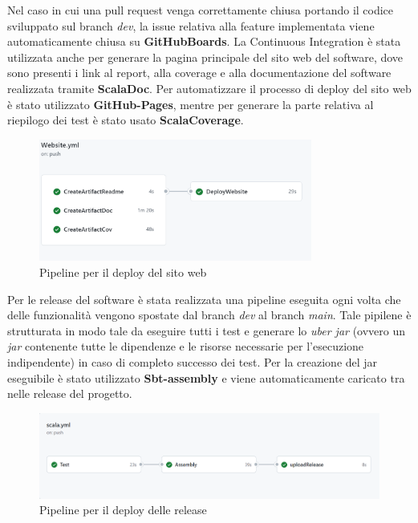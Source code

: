         Nel caso in cui una pull request venga correttamente chiusa portando il codice sviluppato sul branch \textit{dev}, la issue relativa alla feature implementata viene automaticamente chiusa su \textbf{GitHubBoards}. La Continuous Integration è stata utilizzata anche per generare la pagina principale del sito web del software, dove sono presenti i link al report, alla coverage e alla documentazione del software realizzata tramite \textbf{ScalaDoc}. Per automatizzare il processo di deploy del sito web è stato utilizzato \textbf{GitHub-Pages}, mentre per generare la parte relativa al riepilogo dei test è stato usato \textbf{ScalaCoverage}.
            \begin{figure}[H]
                \centering
                \includegraphics[width=0.8\textwidth]{Images/CI-Website.png}
                \caption{Pipeline per il deploy del sito web}
                \label{CI-Website}
            \end{figure}
        
        Per le release del software è stata realizzata una pipeline eseguita ogni volta che delle funzionalità vengono spostate dal branch \textit{dev} al branch \textit{main}.
        Tale pipilene è strutturata in modo tale da eseguire tutti i test e generare lo \textit{uber jar} (ovvero un \textit{jar} contenente tutte le dipendenze e le risorse necessarie per l'esecuzione indipendente) in caso di completo successo dei test. Per la creazione del jar eseguibile è stato utilizzato \textbf{Sbt-assembly} e viene automaticamente caricato tra nelle release del progetto.
        
            \begin{figure}[H]
                \centering
                \includegraphics[width=1\textwidth]{Images/CI-Test-Deploy.png}
                \caption{Pipeline per il deploy delle release}
                \label{fig:CI-Test-Deploy}
            \end{figure}  

